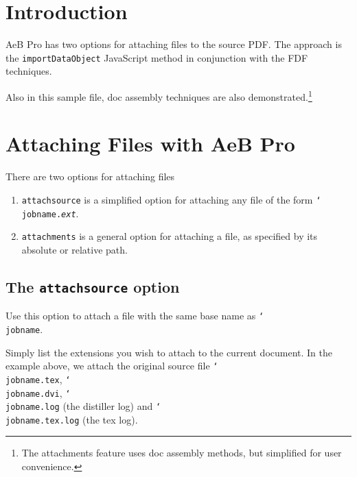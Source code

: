 \documentclass{article}
\newcommand{\cs}[1]{\texttt{\char`\\#1}}
\newenvironment{sverbatim}
{\par\footnotesize\verbatim}{\endverbatim}
\begin{document}
\maketitle

\tableofcontents

\section{Introduction}

AeB Pro has two options for attaching files to the source PDF. The
approach is the \texttt{import\-Data\-Object} JavaScript method in
conjunction with the FDF techniques.

Also in this sample file, doc assembly techniques are also
demonstrated.\footnote{The attachments feature uses doc assembly
methods, but simplified for user convenience.}

\section{Attaching Files with AeB Pro}

There are two options for attaching files
\begin{enumerate}
    \item \texttt{attachsource} is a simplified option for attaching
    any file of the form \cs{jobname.}\texttt{\textsl{ext}}.

    \item \texttt{attachments} is a general option for attaching a
    file, as specified by its absolute or relative path.
\end{enumerate}

\subsection{The \texttt{attachsource} option}

Use this option to attach a file with the same base name as \cs{jobname}.

\begin{sverbatim}
\usepackage[%
    driver=dvips,
    web={
        pro,
        ...
        usesf
    },
    attachsource={tex,dvi,log,tex.log},
    ...
]{aeb_pro}
\end{sverbatim}
Simply list the extensions you wish to attach to the current
document. In the example above, we attach the original source file
\cs{jobname.tex}, \cs{jobname.dvi},  \cs{jobname.log} (the distiller
log) and \cs{jobname.tex.log} (the tex log).
\end{document}
